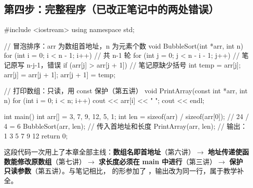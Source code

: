 \subsection{第四步：完整程序（已改正笔记中的两处错误）}
\begin{code}
#include <iostream>
using namespace std;

// 冒泡排序：arr 为数组首地址，n 为元素个数
void BubbleSort(int *arr, int n)
{
    for (int i = 0; i < n - 1; i++)            // 共 n-1 轮
    {
        for (int j = 0; j < n - i - 1; j++)    // 笔记原写 n-j-1，错误
        {
            if (arr[j] > arr[j + 1])           // 笔记原缺少括号
            {
                int temp = arr[j];
                arr[j] = arr[j + 1];
                arr[j + 1] = temp;
            }
        }
    }
}

// 打印数组：只读，用 const 保护（第五讲）
void PrintArray(const int *arr, int n)
{
    for (int i = 0; i < n; i++)
        cout << arr[i] << " ";
    cout << endl;
}

int main()
{
    int arr[] = {3, 7, 9, 12, 5, 1};
    int len = sizeof(arr) / sizeof(arr[0]);    // 24 / 4 = 6
    BubbleSort(arr, len);                      // 传入首地址和长度
    PrintArray(arr, len);                      // 输出：1 3 5 7 9 12
    return 0;
}
\end{code}
\noindent 这段代码一次用上了本章全部主线：\textbf{数组名即首地址}（第六讲）$\to$ \textbf{地址传递使函数能修改原数组}（第七讲）$\to$ \textbf{ 求长度必须在 main 中进行}（第三讲）$\to$ \textbf{ 保护只读参数}（第五讲）。与笔记相比， 的形参加了 ，输出改为同一行，属于教学补全。

\begin{center}
\end{center}

